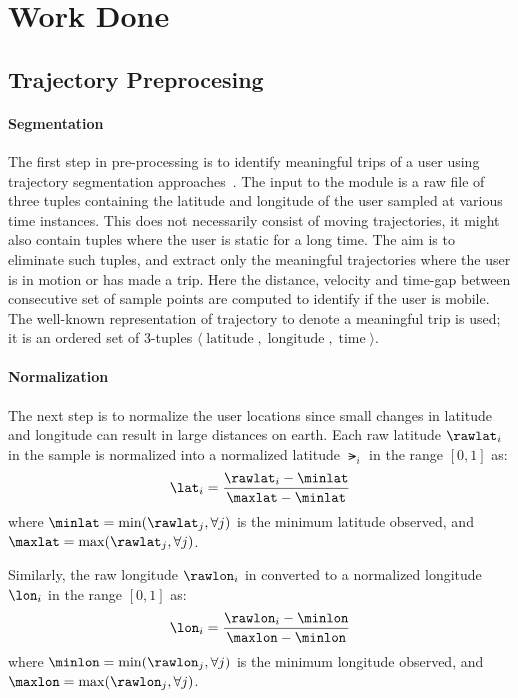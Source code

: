 \section{Work Done}
\subsection{Trajectory Preprocesing} 

\paragraph{Segmentation}
The first step in pre-processing is to identify meaningful trips of a user using trajectory segmentation approaches~\cite{Zheng2008}. The input to the module is a raw file of three tuples containing the latitude and longitude of the user sampled at various time instances. This does not necessarily consist of moving trajectories, it might also contain tuples where the user is static for a long time. The aim is to eliminate such tuples, and extract only the meaningful trajectories where the user is in motion or has made a trip. Here the distance, velocity and time-gap between consecutive set of sample points are computed to identify if the user is mobile. The well-known representation of trajectory to denote a meaningful trip is used; it is an ordered set of 3-tuples $\langle \operatorname{latitude},\operatorname{longitude},\operatorname{time} \rangle$.
\paragraph{Normalization}
The next step is to normalize the user locations since small changes in latitude and longitude can result in large distances on earth. Each raw latitude $\rawlat_i$ in the sample is normalized into a normalized latitude $\lat_i$ in the range $[0,1]$ as:
\begin{eqnarray}
\lat_i =\frac{\rawlat_i - \minlat}{\maxlat - \minlat}
\end{eqnarray}
where $\minlat=\min(\rawlat_j, \forall j)$ is the minimum latitude observed, and $\maxlat=\max(\rawlat_j, \forall j)$. 

Similarly, the raw longitude $\rawlon_i$ in converted to a normalized longitude $\lon_i$ in the range $[0,1]$ as:
\begin{eqnarray}
\lon_i =\frac{\rawlon_i - \minlon}{\maxlon - \minlon}
\end{eqnarray}
where $\minlon=\min(\rawlon_j, \forall j)$ is the minimum longitude observed, and $\maxlon=\max(\rawlon_j, \forall j)$. 

